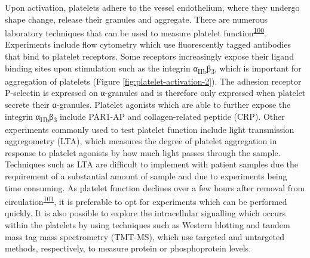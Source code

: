 \documentclass[11pt,twoside]{bristolthesis}
\begin{document}
Upon activation, platelets adhere to the vessel endothelium, where they undergo shape change, release their granules and aggregate. There are numerous laboratory techniques that can be used to measure platelet function\textsuperscript{\protect\hyperlink{ref-Paniccia2015}{100}}. Experiments include flow cytometry which use fluorescently tagged antibodies that bind to platelet receptors. Some receptors increasingly expose their ligand binding sites upon stimulation such as the integrin α\textsubscript{IIb}β\textsubscript{3}, which is important for aggregation of platelets (Figure \ref{fig:platelet-activation-2}). The adhesion receptor P-selectin is expressed on α-granules and is therefore only expressed when platelet secrete their α-granules. Platelet agonists which are able to further expose the integrin α\textsubscript{IIb}β\textsubscript{3} include PAR1-AP and collagen-related peptide (CRP). Other experiments commonly used to test platelet function include light transmission aggregometry (LTA), which measures the degree of platelet aggregation in response to platelet agonists by how much light passes through the sample. Techniques such as LTA are difficult to implement with patient samples due the requirement of a substantial amount of sample and due to experiments being time consuming. As platelet function declines over a few hours after removal from circulation\textsuperscript{\protect\hyperlink{ref-Goss2019}{101}}, it is preferable to opt for experiments which can be performed quickly. It is also possible to explore the intracellular signalling which occurs within the platelets by using techniques such as Western blotting and tandem mass tag mass spectrometry (TMT-MS), which use targeted and untargeted methods, respectively, to measure protein or phosphoprotein levels.
\end{document}
